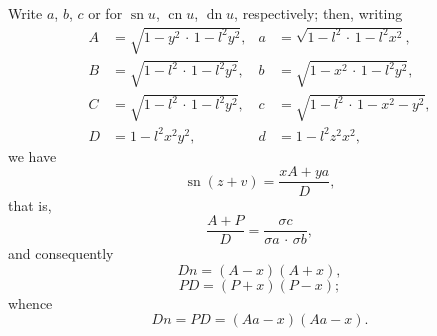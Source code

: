 \documentclass[12pt,a4paper,oneside]{book}
\theoremstyle{plain}
\theoremstyle{definition}
\theoremstyle{remark}
\begin{document}
Write $a$, $b$, $c$ or for $\operatorname{sn} u$, $\operatorname{cn} u$, $\operatorname{dn} u$, respectively; then, writing
\begin{align*}
A&=\sqrt{1-y^2\,\cdot\,1-l^2 y^2},& a&=\sqrt{1-l^2\,\cdot\,1-l^2 x^2},\\
B&=\sqrt{1-l^2\,\cdot\,1-l^2 y^2},& b&=\sqrt{1-x^2\,\cdot\,1-l^2 y^2},\\
C&=\sqrt{1-l^2\,\cdot\,1-l^2 y^2},& c&=\sqrt{1-l^2\,\cdot\,1-x^2-y^2},\\
D&=1-l^2 x^2y^2,& d&=1-l^2 z^2 x^2,
\end{align*}
we have
\[
\operatorname{sn}(z+v)=\frac{x A+y a}{D},
\]
that is,
\[
\frac{A+P}{D}=\frac{\sigma c}{\sigma a\,\cdot\,\sigma b},
\]
and consequently
\[
Dn=(A-x)(A+x),
\]
\[
PD=(P+x)(P-x);
\]
whence
\[
Dn=PD=(Aa-x)(Aa-x).
\]
\end{document}
